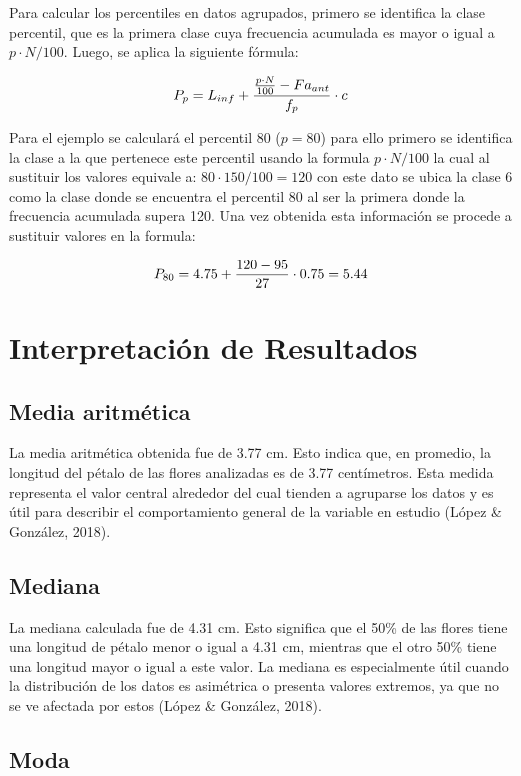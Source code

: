 \documentclass[
  spanish,
  letterpaper,
]{book}
\begin{document}
Para calcular los percentiles en datos agrupados, primero se identifica
la clase percentil, que es la primera clase cuya frecuencia acumulada es
mayor o igual a \(p \cdot N/100\). Luego, se aplica la siguiente
fórmula:

\[\huge P_p = L_{inf} + \frac{\frac{p \cdot N}{100} - Fa_{ant}}{f_p} \cdot c\]

Para el ejemplo se calculará el percentil 80 (\(p=80\)) para ello
primero se identifica la clase a la que pertenece este percentil usando
la formula \(p \cdot N/100\) la cual al sustituir los valores equivale
a: \(80 \cdot 150/100= 120\) con este dato se ubica la clase 6 como la
clase donde se encuentra el percentil 80 al ser la primera donde la
frecuencia acumulada supera 120. Una vez obtenida esta información se
procede a sustituir valores en la formula:

\[\huge P_{80} = 4.75 + \frac {120 - 95}{27} \cdot 0.75=5.44\]

\section{Interpretación de
Resultados}\label{interpretaciuxf3n-de-resultados}

\subsection{Media aritmética}\label{media-aritmuxe9tica-4}

La media aritmética obtenida fue de 3.77 cm. Esto indica que, en
promedio, la longitud del pétalo de las flores analizadas es de 3.77
centímetros. Esta medida representa el valor central alrededor del cual
tienden a agruparse los datos y es útil para describir el comportamiento
general de la variable en estudio (López \& González, 2018).

\subsection{Mediana}\label{mediana-4}

La mediana calculada fue de 4.31 cm. Esto significa que el 50\% de las
flores tiene una longitud de pétalo menor o igual a 4.31 cm, mientras
que el otro 50\% tiene una longitud mayor o igual a este valor. La
mediana es especialmente útil cuando la distribución de los datos es
asimétrica o presenta valores extremos, ya que no se ve afectada por
estos (López \& González, 2018).

\subsection{Moda}\label{moda-4}
\end{document}
